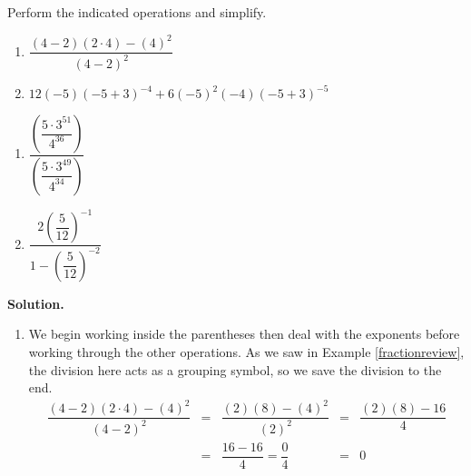 \begin{ex} \label{exponentreview}  Perform the indicated operations and simplify.

\begin{multicols}{2}

\begin{enumerate}

\item  $\dfrac{(4-2)(2 \cdot 4)-(4)^2}{(4-2)^2}$

\item $12(-5)(-5+3)^{-4}+6(-5)^2(-4)(-5+3)^{-5}$

\setcounter{HW}{\value{enumi}}

\end{enumerate}

\end{multicols}

\begin{multicols}{2}

\begin{enumerate}

\setcounter{enumi}{\value{HW}}

\item  $\dfrac{\left(\dfrac{5\cdot 3^{51}}{4^{36}}\right)}{\left(\dfrac{5 \cdot 3^{49}}{4^{34}}\right)}$

\item $\dfrac{2 \left(\dfrac{5}{12}\right)^{-1}}{1 - \left(\dfrac{5}{12}\right)^{-2}}$

\end{enumerate}

\end{multicols}


{\bf Solution.}

\begin{enumerate}

\item  We begin working inside the parentheses then deal with the exponents before working through the other operations.  As we saw in Example \ref{fractionreview}, the division here acts as a grouping symbol, so we save the division to the end.\[ \begin{array}{rclcl}

\dfrac{(4-2)(2 \cdot 4)-(4)^2}{(4-2)^2} & = & \dfrac{(2)(8)-(4)^2}{(2)^2} & = & \dfrac{(2)(8)-16}{4} \\ [10pt]
                                        & = & \dfrac{16-16}{4} = \dfrac{0}{4} & = & 0 \\ \end{array}\]


\end{enumerate}
\end{ex}
